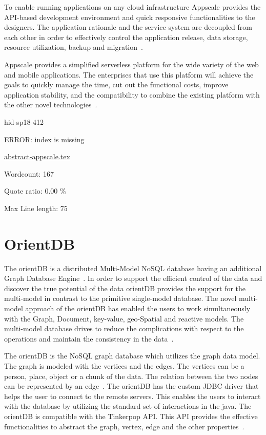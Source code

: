 To enable running applications on any cloud infrastructure Appscale 
provides the API-based development environment and quick responsive 
functionalities to the designers. The application rationale and the 
service system are decoupled from each other in order to effectively 
control the application release, data storage, resource utilization, 
backup and migration~\cite{hid-sp18-412-wiki_appscale}.

Appscale provides a simplified serverless platform for the wide 
variety of the web and mobile applications. The enterprises that use 
this platform will achieve the goals to quickly manage the time, 
cut out the functional costs, improve application stability, and 
the compatibility to combine the existing platform with the other 
novel technologies~\cite{hid-sp18-412-git_appscale}.





\begin{IU}

hid-sp18-412

ERROR: index is missing

\href{https://github.com/cloudmesh-community/hid-sp18-412/blob/master//technology/abstract-appscale.tex}{abstract-appscale.tex}

 

Wordcount: 167


Quote ratio: 0.00 \%
 
Max Line length: 75
\end{IU}

\section{OrientDB}
The orientDB  is a distributed Multi-Model NoSQL database having an additional
Graph Database Engine~\cite{hid-sp18-412-orientDB_by_CallidusCloud}. In order
to support the efficient control of the data and
discover the true potential of the data orientDB provides the support for the
multi-model in contrast to the primitive single-model database. The novel
multi-model approach of the orientDB has enabled the users to work
simultaneously with the Graph, Document, key-value, geo-Spatial and
reactive models. The multi-model database drives to reduce the
complications with respect to the operations and maintain the consistency
in the data~\cite{hid-sp18-412-orientDB_multimodel}.

The orientDB is the NoSQL graph database which utilizes the graph data model. 
The graph is modeled with the vertices and the edges. The vertices can be a 
person, place, object or a chunk of the data. The relation between the two 
nodes can be represented by an edge~\cite{hid-sp18-412-orientDB_graph}. 
The orientDB has the custom JDBC driver that helps the user to connect 
to the remote servers. This enables the users to interact with the 
database by utilizing the standard set of interactions in the java. 
The orientDB is compatible with the Tinkerpop API. This API provides 
the effective functionalities to abstract the graph, vertex, edge 
and the other properties~\cite{hid-sp18-412-orientDB_graph}.

